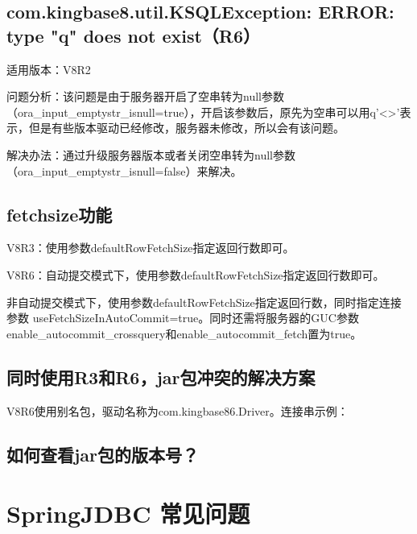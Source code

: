 \documentclass[a4,10pt,oneside,english]{sphinxmanual}
\begin{document}
\subsection{com.kingbase8.util.KSQLException: ERROR: type "q" does not exist（R6）}
\label{\detokenize{interface/jdbc:com-kingbase8-util-ksqlexception-error-type-q-does-not-exist-r6}}
适用版本：V8R2

问题分析：该问题是由于服务器开启了空串转为null参数（ora\_input\_emptystr\_isnull=true），开启该参数后，原先为空串可以用q'<>'表示，但是有些版本驱动已经修改，服务器未修改，所以会有该问题。

解决办法：通过升级服务器版本或者关闭空串转为null参数（ora\_input\_emptystr\_isnull=false）来解决。


\subsection{fetchsize功能}
\label{\detokenize{interface/jdbc:fetchsize}}
V8R3：使用参数defaultRowFetchSize指定返回行数即可。

V8R6：自动提交模式下，使用参数defaultRowFetchSize指定返回行数即可。

非自动提交模式下，使用参数defaultRowFetchSize指定返回行数，同时指定连接参数     useFetchSizeInAutoCommit=true。同时还需将服务器的GUC参数enable\_autocommit\_crossquery和enable\_autocommit\_fetch置为true。


\subsection{同时使用R3和R6，jar包冲突的解决方案}
\label{\detokenize{interface/jdbc:r3r6-jar}}
V8R6使用别名包，驱动名称为com.kingbase86.Driver。连接串示例：


\subsection{如何查看jar包的版本号？}
\label{\detokenize{interface/jdbc:jar}}
\begin{sphinxVerbatim}[commandchars=\\\{\}]
   
\end{sphinxVerbatim}


\section{Spring\sphinxhyphen{}JDBC 常见问题}
\label{\detokenize{interface/spring-jdbc:spring-jdbc}}\label{\detokenize{interface/spring-jdbc::doc}}
\end{document}
